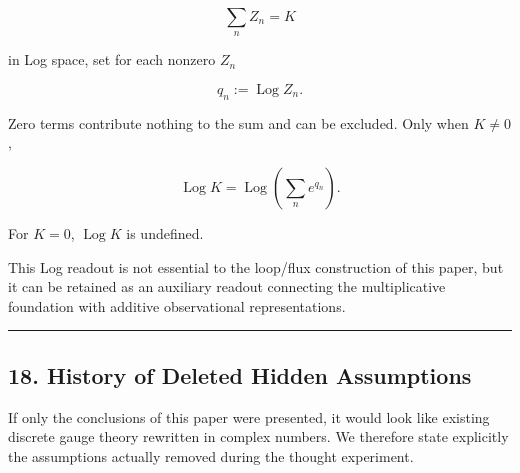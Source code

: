 \documentclass[
  a4paper,
]{article}
\begin{document}
\[
\sum_n Z_n=K
\]

in Log space, set for each nonzero \(Z_n\)

\[
q_n:=\operatorname{Log}Z_n.
\]

Zero terms contribute nothing to the sum and can be excluded. Only when
\(K\neq0\),

\[
\operatorname{Log} K=\operatorname{Log}\left(\sum_n e^{q_n}\right).
\]

For \(K=0\), \(\operatorname{Log}K\) is undefined.

This Log readout is not essential to the loop/flux construction of this
paper, but it can be retained as an auxiliary readout connecting the
multiplicative foundation with additive observational representations.

\begin{center}\rule{0.5\linewidth}{0.5pt}\end{center}

\subsection{18. History of Deleted Hidden
Assumptions}\label{history-of-deleted-hidden-assumptions}

If only the conclusions of this paper were presented, it would look like
existing discrete gauge theory rewritten in complex numbers. We
therefore state explicitly the assumptions actually removed during the
thought experiment.
\end{document}
